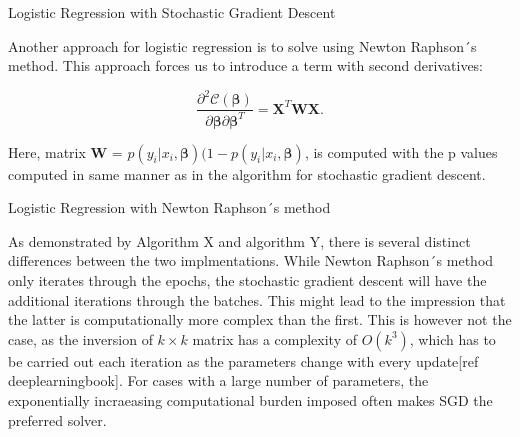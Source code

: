 \documentclass{article}
\begin{document}
\begin{algorithm}
  \caption{\label{alg:sgd}Logistic Regression with Stochastic Gradient Descent}
\end{algorithm}

Another approach for logistic regression is to solve using Newton Raphson´s method. This approach forces us to introduce a term with second derivatives: 

    \[
\frac{\partial^2 \mathcal{C}(\boldsymbol{\beta})}{\partial \boldsymbol{\beta}\partial \boldsymbol{\beta}^T} = \boldsymbol{X}^T\boldsymbol{W}\boldsymbol{X}.
\]

Here, matrix $\boldsymbol{W}$ = $p(y_i\vert x_i,\boldsymbol{\beta})(1-p(y_i\vert x_i,\boldsymbol{\beta})$, is computed with the p values computed in same manner as in the algorithm for stochastic gradient descent.  

\begin{algorithm}
  \caption{\label{alg:sgd}Logistic Regression with Newton Raphson´s method}
\end{algorithm}


As demonstrated by Algorithm X and algorithm Y, there is several distinct differences between the two implmentations. While Newton Raphson´s method only iterates through the epochs, the stochastic gradient descent will have the additional iterations through the batches. This might lead to the impression that the latter is computationally more complex than the first. This is however not the case, as the inversion of  $k \times k$ matrix has a complexity of $O(k^3)$, which has to be carried out each iteration as the parameters change with every update[ref deeplearningbook]. For cases with a large number of parameters, the exponentially incraeasing computational burden imposed often makes SGD the preferred solver. 
\end{document}
